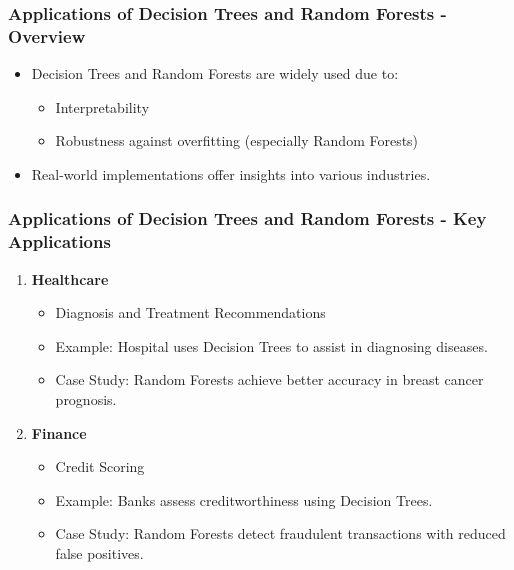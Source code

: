 \documentclass[aspectratio=169]{beamer}
\begin{document}
\begin{frame}[fragile]
    \frametitle{Applications of Decision Trees and Random Forests - Overview}
    \begin{itemize}
        \item Decision Trees and Random Forests are widely used due to:
        \begin{itemize}
            \item Interpretability
            \item Robustness against overfitting (especially Random Forests)
        \end{itemize}
        \item Real-world implementations offer insights into various industries.
    \end{itemize}
\end{frame}

\begin{frame}[fragile]
    \frametitle{Applications of Decision Trees and Random Forests - Key Applications}
    \begin{enumerate}
        \item \textbf{Healthcare}
        \begin{itemize}
            \item Diagnosis and Treatment Recommendations
            \item Example: Hospital uses Decision Trees to assist in diagnosing diseases.
            \item Case Study: Random Forests achieve better accuracy in breast cancer prognosis.
        \end{itemize}

        \item \textbf{Finance}
        \begin{itemize}
            \item Credit Scoring
            \item Example: Banks assess creditworthiness using Decision Trees.
            \item Case Study: Random Forests detect fraudulent transactions with reduced false positives.
        \end{itemize}
    \end{enumerate}
\end{frame}
\end{document}
